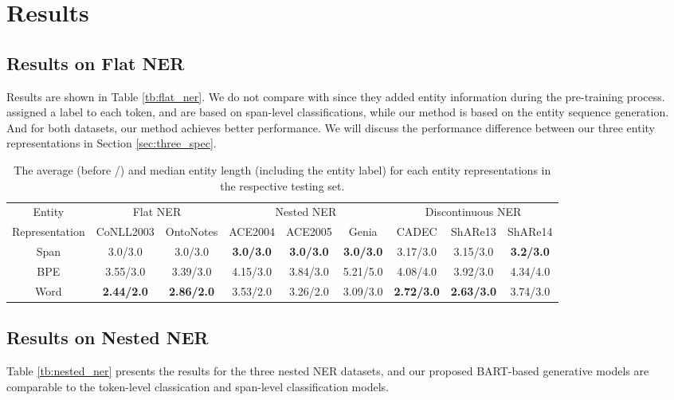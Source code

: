 \documentclass[11pt,a4paper]{article}
\begin{document}
\section{Results}
\subsection{Results on Flat NER}
Results are shown in Table \ref{tb:flat_ner}. We do not compare with \citet{DBLP:conf/emnlp/YamadaASTM20} since they added entity information during the pre-training process. \citet{DBLP:conf/emnlp/ClarkLML18,DBLP:conf/naacl/PetersNIGCLZ18,DBLP:conf/naacl/AkbikBV19,DBLP:conf/acl/StrakovaSH19} assigned a label to each token, and \citet{DBLP:conf/acl/LiFMHWL20,DBLP:conf/acl/YuBP20} are based on span-level classifications, while our method is based on the entity sequence generation. And for both datasets, our method achieves better performance. We will discuss the performance difference between our three entity representations in Section \ref{sec:three_spec}.

\begin{table*}[bth]
  \centering
  \setlength{\tabcolsep}{2pt}  \renewcommand{\arraystretch}{1.2}
  \begin{tabular}{c|c|c|c|c|c|c|c|c}
\toprule
     Entity& \multicolumn{2}{c|}{Flat NER} & \multicolumn{3}{c|}{Nested NER} & \multicolumn{3}{c}{Discontinuous NER} \\
     \cline{2-9}
Representation & CoNLL2003 & OntoNotes & ACE2004  & ACE2005  & Genia    & CADEC    & ShARe13 & ShARe14 \\
\midrule
   Span & 3.0/3.0   & 3.0/3.0   & \textbf{3.0/3.0}  & \textbf{3.0/3.0}  & \textbf{3.0/3.0}  & 3.17/3.0 & 3.15/3.0  & \textbf{3.2/3.0} \\
  BPE  & 3.55/3.0  & 3.39/3.0  & 4.15/3.0 & 3.84/3.0 & 5.21/5.0 & 4.08/4.0 & 3.92/3.0 & 4.34/4.0 \\
  Word & \textbf{2.44/2.0}  & \textbf{2.86/2.0}  & 3.53/2.0  & 3.26/2.0 & 3.09/3.0 & \textbf{2.72/3.0} & \textbf{2.63/3.0} & 3.74/3.0 \\
\bottomrule
  \end{tabular}
  \caption{The average (before /) and median entity length (including the entity label) for each entity representations in the respective testing set.}
  \label{tb:avg_length}
\end{table*}

\subsection{Results on Nested NER}
Table \ref{tb:nested_ner} presents the results for the three nested NER datasets, and our proposed BART-based generative models are comparable to the token-level classication \citep{DBLP:conf/acl/StrakovaSH19,DBLP:journals/tacl/ShibuyaH20} and span-level classification \citep{DBLP:conf/naacl/LuanWHSOH19,DBLP:conf/acl/LiFMHWL20,DBLP:conf/acl/WangSCC20} models.
\end{document}
